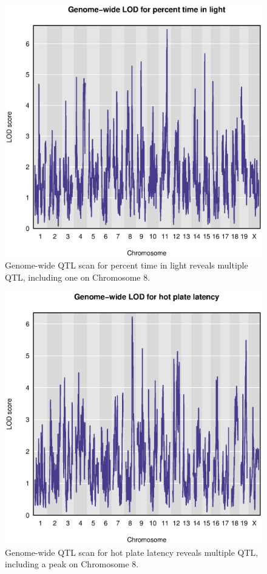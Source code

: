 \documentclass[12pt,twoside, lineno]{gsajnl}
\begin{document}
\clearpage


\renewcommand{\thefigure}{\textbf{S\arabic{figure}}}
\setcounter{figure}{0}

\begin{figure}[hb]
\includegraphics{../Rmd/genomewide_lod_trait10.eps}
\caption{Genome-wide QTL scan for percent time in light reveals
  multiple QTL, including one on Chromosome 8.}
\label{fig:genomewide10}
\end{figure}

\clearpage

\begin{figure}[hb]
\includegraphics{../Rmd/genomewide_lod_trait22.eps}
\caption{Genome-wide QTL scan for hot plate latency reveals multiple
  QTL, including a peak on Chromosome 8.}
\label{fig:genomewide22}
\end{figure}
\end{document}
